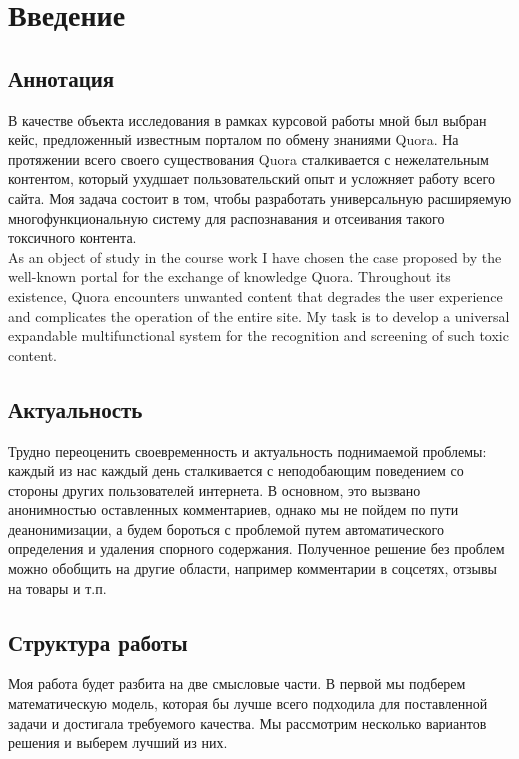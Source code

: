 \section{Введение}

\subsection{Аннотация}
    В качестве объекта исследования в рамках курсовой работы мной был выбран кейс, предложенный известным порталом по обмену знаниями Quora. На протяжении всего своего существования Quora сталкивается с нежелательным контентом, который ухудшает пользовательский опыт и усложняет работу всего сайта. Моя задача состоит в том, чтобы разработать универсальную расширяемую многофункциональную систему для распознавания и отсеивания такого токсичного контента.\\
    
    As an object of study in the course work I have chosen the case proposed by the well-known portal for the exchange of knowledge Quora. Throughout its existence, Quora encounters unwanted content that degrades the user experience and complicates the operation of the entire site. My task is to develop a universal expandable multifunctional system for the recognition and screening of such toxic content.
\subsection{Актуальность}

    Трудно переоценить своевременность и актуальность поднимаемой проблемы: каждый из нас каждый день сталкивается с неподобающим поведением со стороны других пользователей интернета. В основном, это вызвано анонимностью оставленных комментариев, однако мы не пойдем по пути деанонимизации, а будем бороться с проблемой путем автоматического определения и удаления спорного содержания. Полученное решение без проблем можно обобщить на другие области, например комментарии в соцсетях, отзывы на товары и т.п.

\subsection{Структура работы}

    	Моя работа будет разбита на две смысловые части. В первой мы подберем математическую модель, которая бы лучше всего подходила для поставленной задачи и достигала требуемого качества. Мы рассмотрим несколько вариантов решения и выберем лучший из них.
    	
